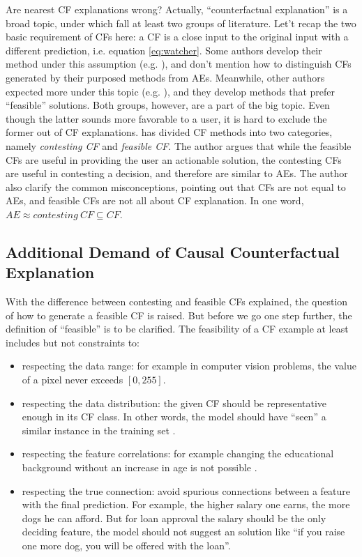 Are nearest CF explanations wrong? Actually, ``counterfactual explanation'' is a broad topic, under which fall at least two groups of literature. Let't recap the two basic requirement of CFs here: a CF is a close input to the original input with a different prediction, i.e. equation \ref{eq:watcher}. Some authors develop their method under this assumption (e.g. \cite{certifai,watcher2017,DiCE}), and don't mention how to distinguish CFs generated by their purposed methods from AEs. Meanwhile, other authors expected more under this topic (e.g. \cite{prototype}), and they develop methods that prefer ``feasible'' solutions. Both groups, however, are a part of the big topic. Even though the latter sounds more favorable to a user, it is hard to exclude the former out of CF explanations. \citeauthor{CFandAE} \cite{CFandAE} has divided CF methods into two categories, namely \emph{contesting CF} and \emph{feasible CF}. The author argues that while the feasible CFs are useful in providing the user an actionable solution, the contesting CFs are useful in contesting a decision, and therefore are similar to AEs. The author also clarify the common misconceptions, pointing out that CFs are not equal to AEs, and feasible CFs are not all about CF explanation. In one word, $AE\approx contesting\ CF\subseteq CF$.
 \subsection{Additional Demand of Causal Counterfactual Explanation}
 With the difference between contesting and feasible CFs explained, the question of how to generate a feasible CF is raised. But before we go one step further, the definition of ``feasible'' is to be clarified. The feasibility of a CF example at least includes but not constraints to:
 \begin{itemize}
   \item respecting the data range: for example in computer vision problems, the value of a pixel never exceeds $[0,255]$. 
   \item respecting the data distribution: the given CF should be representative enough in its CF class. In other words, the model should have ``seen'' a similar instance in the training set \cite{prototype}.
   \item respecting the feature correlations: for example changing the educational background without an increase in age is not possible \cite{DiCE}.
   \item respecting the true connection: avoid spurious connections between a feature with the final prediction. For example, the higher salary one earns, the more dogs he can afford. But for loan approval the salary should be the only deciding feature, the model should not suggest an solution like ``if you raise one more dog, you will be offered with the loan''.
 \end{itemize}

